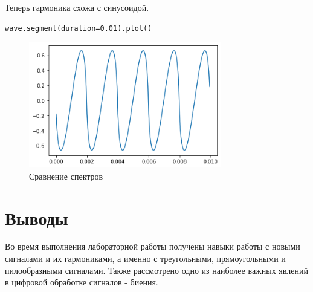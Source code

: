 \documentclass[a4paper,12pt]{report}
\begin{document}
Теперь гармоника схожа с синусоидой.

\begin{lstlisting}[caption=Сегмент звука]
wave.segment(duration=0.01).plot()
\end{lstlisting}

\begin{figure}[H]
        \centering
        \includegraphics[width=0.75\textwidth]{9.png}
        \caption{Сравнение спектров}
        \label{fig:fig6_3}
\end{figure}

\chapter{Выводы}

Во время выполнения лабораторной работы получены навыки работы с новыми сигналами и их гармониками, а именно с треугольными, прямоугольными и пилообразными сигналами. Также рассмотрено одно из наиболее важных явлений в цифровой обработке сигналов - биения.
\end{document}

